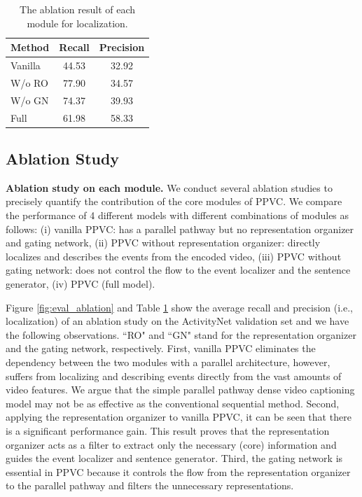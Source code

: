 \begin{table}[t]
   \centering
   \caption{
      The ablation result of each module for localization.
   }
   \begin{tabular}{l|c|c}
      \hline
      Method & Recall & Precision \\
      \hline
      Vanilla    & 44.53 & 32.92 \\
      W/o RO    & 77.90 & 34.57 \\
      W/o GN    & 74.37 & 39.93 \\
      Full       & 61.98 & 58.33 \\
      \hline
  \end{tabular}
  \label{tab:eval_ablation_event_localization}
 \end{table}
 


\subsection{Ablation Study}
\label{subsec:experiments-ablation_study}
\textbf{Ablation study on each module.}
We conduct several ablation studies to precisely quantify the contribution of the core modules of PPVC.
We compare the performance of 4 different models with different combinations of modules as follows: (i) vanilla PPVC: has a parallel pathway but no representation organizer and gating network, (ii) PPVC without representation organizer: directly localizes and describes the events from the encoded video, (iii) PPVC without gating network: does not control the flow to the event localizer and the sentence generator, (iv) PPVC (full model).

Figure {\ref{fig:eval_ablation}} and Table {\ref{tab:eval_ablation_event_localization}} show the average recall and precision (i.e., localization) of an ablation study on the ActivityNet validation set and we have the following observations.
``RO" and ``GN" stand for the representation organizer and the gating network, respectively.
First, vanilla PPVC eliminates the dependency between the two modules with a parallel architecture, however, suffers from localizing and describing events directly from the vast amounts of video features.
We argue that the simple parallel pathway dense video captioning model may not be as effective as the conventional sequential method.
Second, applying the representation organizer to vanilla PPVC, it can be seen that there is a significant performance gain.
This result proves that the representation organizer acts as a filter to extract only the necessary (core) information and guides the event localizer and sentence generator.
Third, the gating network is essential in PPVC because it controls the flow from the representation organizer to the parallel pathway and filters the unnecessary representations.
%

